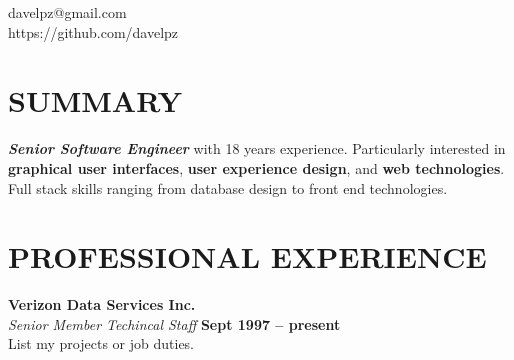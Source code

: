 \documentclass[margin,line]{resume}
\begin{document}
{
    \hfill davelpz@gmail.com           \vspace{0mm}\\\vspace{0mm}%
    \hfill https://github.com/davelpz \vspace{0mm}\\\vspace{-9mm}%
}

\begin{resume}

    \vspace{-3mm}

    \section{\mysidestyle \textbf{\large{S}\small{UMMARY}}}

    \textbf{\textsl{Senior Software Engineer}} with 18 years experience.  Particularly interested in \textbf{graphical user interfaces}, \textbf{user experience design}, and \textbf{web technologies}.  Full stack skills ranging from database design to front end technologies.

    \vspace{-1mm}

\sectionline

    \section{\mysidestyle \textbf{\large{P}\small{ROFESSIONAL} \large{E}\small{XPERIENCE}}}

    \textbf{\listing Verizon Data Services Inc.} \vspace{2mm}\\\vspace{1mm}%
    \textsl{Senior Member Techincal Staff} \hfill \textbf{Sept 1997 -- present}\\
    List my projects or job duties.


\end{resume}
\end{document}
